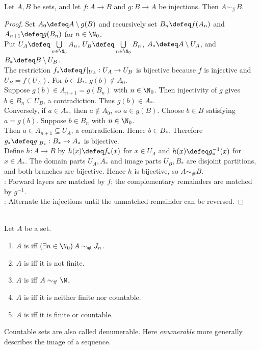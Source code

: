 \begin{theorem} \label{thm:schroeder-bernstein} \\
Let $A,B$ be sets, and let $f:A\to B$ and $g:B\to A$ be injections. Then $A\sim_{\#}B$.
\begin{proof}
Set $A_0\defeq A\setminus g(B)$ and recursively set $B_n\defeq f(A_n)$ and $A_{n+1}\defeq g(B_n)$ for $n\in\N_0$.\\
Put $U_A\defeq\bigcup\limits_{n\in\N_0}A_n$, $U_B\defeq\bigcup\limits_{n\in\N_0}B_n$, $A_*\defeq A\setminus U_A$, and $B_*\defeq B\setminus U_B$.\\
The restriction $f_*\defeq f|_{U_A}:U_A\to U_B$ is bijective because $f$ is injective and $U_B=f(U_A)$. For $b\in B_*$, $g(b)\notin A_0$.\\
Suppose $g(b)\in A_{n+1}=g(B_n)$ with $n\in\N_0$. Then injectivity of $g$ gives $b\in B_n\subseteq U_B$, a contradiction. Thus $g(b)\in A_*$.\\
Conversely, if $a\in A_*$, then $a\notin A_0$, so $a\in g(B)$. Choose $b\in B$ satisfying $a=g(b)$. Suppose $b\in B_n$ with $n\in\N_0$.\\
Then $a\in A_{n+1}\subseteq U_A$, a contradiction. Hence $b\in B_*$. Therefore $g_*\defeq g|_{B_*}:B_*\to A_*$ is bijective.\\
Define $h:A\to B$ by $h(x)\defeq f_*(x)$ for $x\in U_A$ and $h(x)\defeq g_*^{-1}(x)$ for $x\in A_*$. The domain parts $U_A,A_*$ and image parts $U_B,B_*$ are disjoint partitions, and both branches are bijective. Hence $h$ is bijective, so $A\sim_{\#}B$.\\
: Forward layers are matched by $f$; the complementary remainders are matched by $g^{-1}$.\\
: Alternate the injections until the unmatched remainder can be reversed.
\end{proof}
\end{theorem}

\begin{definition} \label{def:finite-countable-uncountable} \\
Let $A$ be a set.
\begin{enumerate}[label=(\roman*)]
\setlength{\itemsep}{0pt}
\item $A$ is  iff $(\exists n\in\N_0)\,A\sim_{\#}J_n$.
\item $A$ is  iff it is not finite.
\item $A$ is  iff $A\sim_{\#}\N$.
\item $A$ is  iff it is neither finite nor countable.
\item $A$ is  iff it is finite or countable.
\end{enumerate}
Countable sets are also called denumerable. Here \emph{enumerable} more generally describes the image of a sequence.
\end{definition}

